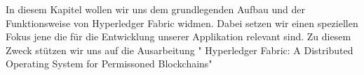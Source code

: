In diesem Kapitel wollen wir uns dem grundlegenden Aufbau und der Funktionsweise von Hyperledger Fabric widmen. Dabei setzen wir einen speziellen Fokus jene die für die Entwicklung unserer Applikation relevant sind. Zu diesem Zweck stützen wir uns auf die Ausarbeitung " Hyperledger Fabric: A Distributed Operating System for Permissoned Blockchains"\cite{androulaki2018hyperledger} 
